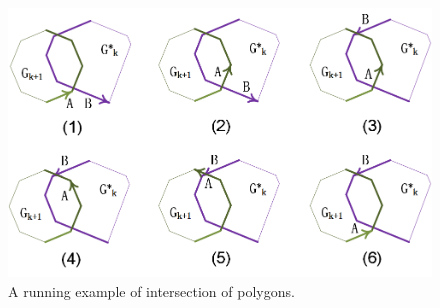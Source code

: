 \begin{figure}[tb!]
\centering
\includegraphics[scale=0.88]{figures/Fig-poly-inter.png}
\vspace{-1ex}
\caption{\small A running example of intersection of polygons.}
\vspace{-2ex}
\label{fig:p-poly-inter}
\end{figure}




